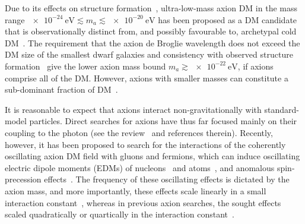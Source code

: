Due to its effects on structure formation~\cite{Khlopov1985}, ultra-low-mass axion DM in the mass range $\SI{e-24}{\electronvolt} \lesssim m_a \lesssim \SI{e-20}{\electronvolt}$ has been proposed as a DM candidate that is observationally distinct from, and possibly favourable to, archetypal cold DM~\cite{Hu2000,Marsh2014,Schive2014,Marsh2015Review,Hui2017}.
The requirement that the axion de Broglie wavelength does not exceed the DM size of the smallest dwarf galaxies and consistency with observed structure formation~\cite{Marsh2015B,Schive2015,Marsh2017} give the lower axion mass bound $m_a \gtrsim \SI{e-22}{\electronvolt}$, if axions comprise all of the DM\@. However, axions with smaller masses can constitute a sub-dominant fraction of DM~\cite{Hlozek15}.

It is reasonable to expect that axions interact non-gravitationally with standard-model particles.
Direct searches for axions have thus far focused mainly on their coupling to the photon (see the review~\cite{Axion-Review2015} and references therein).
Recently, however, it has been proposed to search for the interactions of the coherently oscillating axion DM field with gluons and fermions, which can induce oscillating electric dipole moments (EDMs) of nucleons~\cite{Graham2011} and atoms~\cite{Stadnik2014A,Roberts2014A,Roberts2014B}, and anomalous spin-precession effects~\cite{Flambaum2013Patras,Stadnik2014A,Graham2013}.
The frequency of these oscillating effects is dictated by the axion mass, and more importantly, these effects scale linearly in a small interaction constant~\cite{Graham2011,Stadnik2014A,Roberts2014A,Roberts2014B,Flambaum2013Patras,Graham2013}, whereas in previous axion searches, the sought effects scaled quadratically or quartically in the interaction constant~\cite{Axion-Review2015}.

